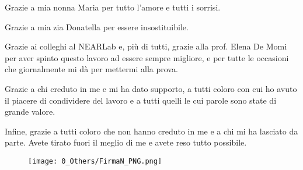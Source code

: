 \documentclass[../main.tex]{subfiles}
\begin{document}
Grazie a mia nonna Maria per tutto l'amore e tutti i sorrisi.

Grazie a mia zia Donatella per essere insostituibile.

Grazie ai colleghi al NEARLab e, più di tutti, grazie alla prof. Elena De Momi per aver spinto questo lavoro ad essere sempre migliore, e per tutte le occasioni che giornalmente mi dà per mettermi alla prova.

Grazie a chi creduto in me e mi ha dato supporto, a tutti coloro con cui ho avuto il piacere di condividere del lavoro e a tutti quelli le cui parole sono state di grande valore. 

Infine, grazie a tutti coloro che non hanno creduto in me e a chi mi ha lasciato da parte. Avete tirato fuori il meglio di me e avete reso tutto possibile. 
\vspace{0.5cm}
\begin{figure}[h!]
    \raggedright 
    \texttt{[image: 0\_Others/FirmaN\_PNG.png]}
\end{figure}
\end{document}
